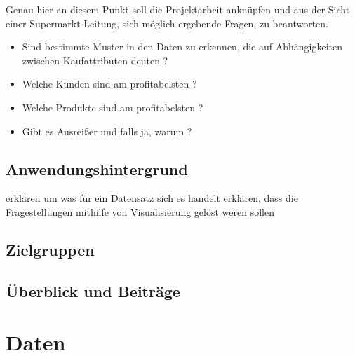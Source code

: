 \documentclass[usegeometry=true]{scrartcl}
\begin{document}
\noindent Genau hier an diesem Punkt soll die Projektarbeit anknüpfen und aus der Sicht einer Supermarkt-Leitung, sich möglich ergebende Fragen, zu beantworten.
\begin{itemize}
	\item Sind bestimmte Muster in den Daten zu erkennen, die auf Abhängigkeiten zwischen Kaufattributen deuten ?
	\item Welche Kunden sind am profitabelsten ?
	\item Welche Produkte sind am profitabelsten ?
	\item Gibt es Ausreißer und falls ja, warum ?
\end{itemize}

\subsection{Anwendungshintergrund}
erklären um was für ein Datensatz sich es handelt
erklären, dass die Fragestellungen mithilfe von Visualisierung gelöst weren sollen

\subsection{Zielgruppen}
\subsection{Überblick und Beiträge}

\section{Daten}

\printbibliography
\end{document}

